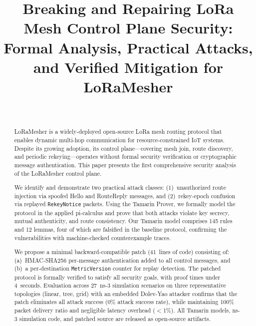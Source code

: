 \documentclass[journal]{IEEEtran}
\begin{document}
\title{Breaking and Repairing LoRa Mesh Control Plane Security:
       Formal Analysis, Practical Attacks, and Verified Mitigation
       for LoRaMesher}

\author{%
  \\
  \IEEEauthorblockA{[Institution]}
}


\maketitle

\begin{abstract}
LoRaMesher is a widely-deployed open-source LoRa mesh routing protocol
that enables dynamic multi-hop communication for resource-constrained
IoT systems. Despite its growing adoption, its control plane—covering
mesh join, route discovery, and periodic rekeying—operates without
formal security verification or cryptographic message authentication.
This paper presents the first comprehensive security analysis of the
LoRaMesher control plane.

We identify and demonstrate two practical attack classes: (1)~unauthorized
route injection via spoofed Hello and RouteReply messages, and
(2)~rekey-epoch confusion via replayed \texttt{RekeyNotice} packets.
Using the Tamarin Prover, we formally model the protocol in the applied
pi-calculus and prove that both attacks violate key secrecy, mutual
authenticity, and route consistency. Our Tamarin model comprises 145 rules
and 12 lemmas, four of which are falsified in the baseline protocol,
confirming the vulnerabilities with machine-checked counterexample traces.

We propose a minimal backward-compatible patch (41~lines of code)
consisting of: (a)~HMAC-SHA256 per-message authentication added to all
control messages, and (b)~a per-destination \texttt{MetricVersion} counter
for replay detection. The patched protocol is formally verified to satisfy
all security goals, with proof times under 4~seconds. Evaluation across
27~ns-3 simulation scenarios on three representative topologies (linear,
tree, grid) with an embedded Dolev-Yao attacker confirms that the patch
eliminates all attack success (0\% attack success rate), while
maintaining 100\% packet delivery ratio and negligible latency overhead
($<$1\%). All Tamarin models, ns-3 simulation code, and patched source
are released as open-source artifacts.
\end{abstract}
\end{document}
